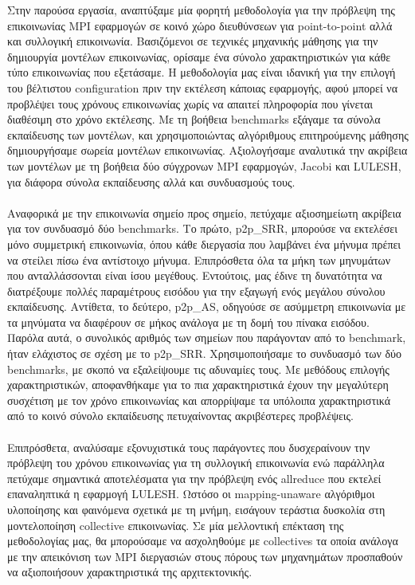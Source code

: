 Στην παρούσα εργασία, αναπτύξαμε μία φορητή μεθοδολογία για την πρόβλεψη της επικοινωνίας MPI εφαρμογών σε κοινό χώρο διευθύνσεων για point-to-point αλλά και συλλογική επικοινωνία. Βασιζόμενοι σε τεχνικές μηχανικής μάθησης για την δημιουργία μοντέλων επικοινωνίας, ορίσαμε ένα σύνολο χαρακτηριστικών για κάθε τύπο επικοινωνίας που εξετάσαμε. Η μεθοδολογία μας είναι ιδανική για την επιλογή του βέλτιστου configuration πριν την εκτέλεση κάποιας εφαρμογής, αφού μπορεί να προβλέψει τους χρόνους επικοινωνίας χωρίς να απαιτεί πληροφορία που γίνεται διαθέσιμη στο χρόνο εκτέλεσης. Με τη βοήθεια benchmarks εξάγαμε τα σύνολα εκπαίδευσης των μοντέλων, και χρησιμοποιώντας αλγόριθμους επιτηρούμενης μάθησης δημιουργήσαμε σωρεία μοντέλων επικοινωνίας. Αξιολογήσαμε αναλυτικά την ακρίβεια των μοντέλων με τη βοήθεια δύο σύγχρονων MPI εφαρμογών, Jacobi και LULESH, για διάφορα σύνολα εκπαίδευσης αλλά και συνδυασμούς τους.

\paragraph{}
Αναφορικά με την επικοινωνία σημείο προς σημείο, πετύχαμε αξιοσημείωτη ακρίβεια για τον συνδυασμό δύο benchmarks. Το πρώτο, p2p\_SRR, μπορούσε να εκτελέσει μόνο συμμετρική επικοινωνία, όπου κάθε διεργασία που λαμβάνει ένα μήνυμα πρέπει να στείλει πίσω ένα αντίστοιχο μήνυμα. Επιπρόσθετα όλα τα μήκη των μηνυμάτων που ανταλλάσσονται είναι ίσου μεγέθους. Εντούτοις, μας έδινε τη δυνατότητα να διατρέξουμε πολλές παραμέτρους εισόδου για την εξαγωγή ενός μεγάλου σύνολου εκπαίδευσης. Αντίθετα, το δεύτερο, p2p\_AS, οδηγούσε σε ασύμμετρη επικοινωνία με τα μηνύματα να διαφέρουν σε μήκος ανάλογα με τη δομή του πίνακα εισόδου. Παρόλα αυτά, ο συνολικός αριθμός των σημείων που παράγονταν από το benchmark, ήταν ελάχιστος σε σχέση με το p2p\_SRR. Χρησιμοποιήσαμε το συνδυασμό των δύο benchmarks, με σκοπό να εξαλείψουμε τις αδυναμίες τους. Με μεθόδους επιλογής χαρακτηριστικών, αποφανθήκαμε για το πια χαρακτηριστικά έχουν την μεγαλύτερη συσχέτιση με τον χρόνο επικοινωνίας και απορρίψαμε τα υπόλοιπα χαρακτηριστικά από το κοινό σύνολο εκπαίδευσης πετυχαίνοντας ακριβέστερες προβλέψεις. 
\paragraph{}
Επιπρόσθετα, αναλύσαμε εξονυχιστικά τους παράγοντες που δυσχεραίνουν την πρόβλεψη του χρόνου επικοινωνίας για τη συλλογική επικοινωνία ενώ παράλληλα πετύχαμε σημαντικά αποτελέσματα για την πρόβλεψη ενός allreduce που εκτελεί επαναληπτικά η εφαρμογή LULESH. Ωστόσο οι mapping-unaware αλγόριθμοι υλοποίησης και φαινόμενα σχετικά με τη μνήμη, εισάγουν τεράστια δυσκολία στη μοντελοποίηση collective επικοινωνίας. Σε μία μελλοντική επέκταση της μεθοδολογίας μας, θα μπορούσαμε να ασχοληθούμε με collectives τα οποία ανάλογα με την απεικόνιση των MPI διεργασιών στους πόρους των μηχανημάτων προσπαθούν να αξιοποιήσουν χαρακτηριστικά της αρχιτεκτονικής.

